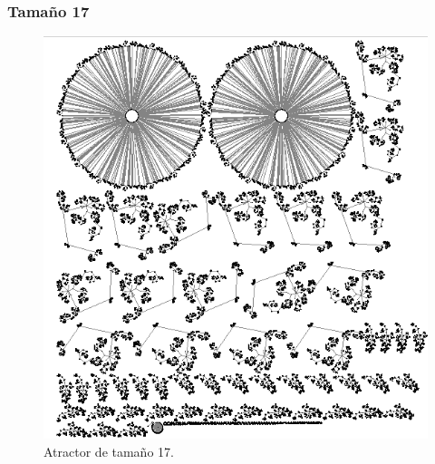 \documentclass[11pt]{article}
\begin{document}
			\subsubsection{Tamaño 17}
			\begin{figure}[H]
			\centering
			\includegraphics[scale=0.8]{resources/Atractores54/atractor_54_size_17.png}
			\caption{Atractor de tamaño 17.}\label{fig:picture}
			\end{figure}
\end{document}
